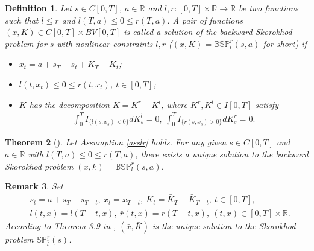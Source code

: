 \documentclass[10pt]{article}%
\numberwithin{equation}{section}
\newtheorem{theorem}{Theorem}[section]
\newtheorem{definition}[theorem]{Definition}
\newtheorem{remark}[theorem]{Remark}
\newtheorem{assumption}[theorem]{Assumption}
\begin{document}
\begin{definition}\label{def2}
Let $s\in C[0,T]$, $a\in \mathbb{R}$ and $l,r:[0,T]\times \mathbb{R}\rightarrow \mathbb{R}$ be two functions such that $l\leq r$ and $l(T,a)\leq 0\leq r(T,a)$. A pair of functions $(x,K)\in C[0,T]\times BV[0,T]$ is called a solution of the backward Skorokhod problem for $s$ with nonlinear constraints $l,r$ ($(x,K)=\mathbb{BSP}_l^r(s,a)$ for short) if 
\begin{itemize}
\item[(i)] $x_t=a+s_T-s_t+K_T-K_t$;
\item[(ii)] $l(t,x_t)\leq 0\leq r(t,x_t)$, $t\in[0,T]$;
\item[(iii)]  $K$ has the decomposition $K=K^r-K^l$, where $K^r,K^l\in I[0,T]$ satisfy %
\begin{align}\label{iii}
\int_0^T I_{\{l(s,x_s)<0\}}dK^l_s=0, \  \int_0^T I_{\{r(s,x_s)>0\}}dK^r_s=0.
\end{align}
\end{itemize}
\end{definition}


\begin{theorem}[\cite{L}]\label{BSP}
Let Assumption \ref{asslr} holds. For any given $s\in C[0,T]$ and $a\in \mathbb{R}$ with $l(T,a)\leq 0\leq r(T,a)$, there exists a unique solution to the backward Skorokhod problem $(x,k)=\mathbb{BSP}_l^r(s,a)$. %
\end{theorem}
\begin{remark}\label{rem2.7}
Set
\begin{equation}
    \begin{split}
     &\bar{s}_t=a+s_T-s_{T-t},\ x_t=\bar{x}_{T-t},\ K_t=\bar{K}_{T}-\bar{K}_{T-t}, \ t\in[0,T],\\ 
     &\bar{l}\left(t,x\right)=l\left(T-t,x\right),\ \bar{r}\left(t,x\right)=r\left(T-t,x\right), \ (t,x)\in[0,T]\times\mathbb{R}.
    \end{split}
\end{equation}
According to Theorem 3.9 in \cite{L},  $\left(\bar{x},\bar{K}\right)$ is the unique solution to the Skorokhod problem $\mathbb{SP}^{\bar{r}}_{\bar{l}}\left(\bar{s}\right)$.
\end{remark}   
 
\end{document}
